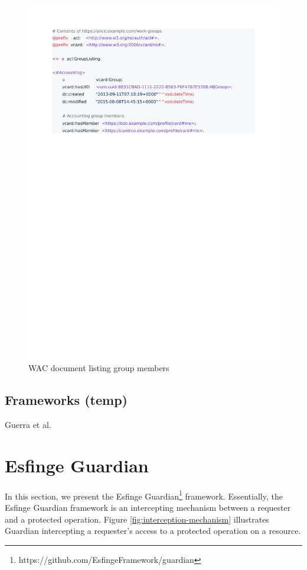 \documentclass[sigconf]{acmart}
\begin{document}
\begin{figure}
  \includegraphics[trim=2cm 19cm 4.7cm 2cm, clip, scale=0.57]{pdf/work-groups}
  \caption{WAC document listing group members}
  \label{fig:group-listing}
\end{figure}


\subsection{Frameworks (temp)}
Guerra et al. \cite{Guerra2015}

\section{Esfinge Guardian}
In this section, we present the Esfinge Guardian\footnote{https://github.com/EsfingeFramework/guardian} framework. Essentially, the Esfinge Guardian framework is an intercepting mechanism between a requester and a protected operation. Figure \ref{fig:interception-mechanism} illustrates Guardian intercepting a requester's access to a protected operation on a resource.
\end{document}
